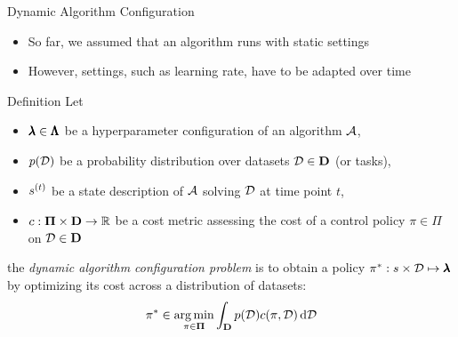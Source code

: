 \begin{frame}[c]{Dynamic Algorithm Configuration}

\begin{itemize}
	\item So far, we assumed that an algorithm runs with static settings
	\item However, settings, such as learning rate, have to be adapted over time
\end{itemize}

\begin{block}{Definition}
	Let 
	\begin{itemize}
		\item $\pmb{\lambda} \in \pmb{\Lambda}$ be a hyperparameter configuration of an algorithm $\mathcal{A}$,
		\pause
		\item $p(\mathcal{D})$ be a probability distribution over datasets $\mathcal{D} \in \mathbf{D}$ (or tasks),
		\pause
		\item $s^{(t)}$ be a state description of $\mathcal{A}$ solving $\mathcal{D}$ at time point $t$,
		\pause
		\item $c: \mathbf{\Pi} \times \mathbf{D} \to \mathbb{R}$ be a cost metric assessing the cost of a control policy $\pi \in \Pi$ on $\mathcal{D} \in \mathbf{D}$
	\end{itemize}
	
	\pause
	the \emph{dynamic algorithm configuration problem} is to obtain a policy $\pi^* : s \times \mathcal{D} \mapsto \pmb{\lambda}$ by optimizing its cost across a distribution of datasets:
	\begin{equation}
	\pi^* \in \operatorname*{arg\,min}_{\pi \in \mathbf{\Pi}} \int_{\mathbf{D}} p(\mathcal{D}) c(\pi, \mathcal{D}) \mathop{}\!\mathrm{d} \mathcal{D} \nonumber
	\end{equation}
\end{block}

\end{frame}

